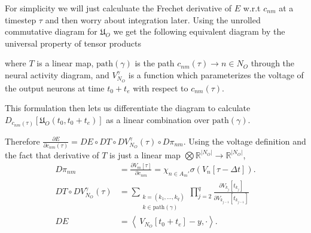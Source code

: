 For simplicity we will just calculuate the Frechet derivative of $E$ w.r.t $c_{nm}$ at a timestep $\tau$ and then worry about integration later. Using the unrolled commutative diagram for $\mathfrak{U}_O$ we get the following equivalent diagram by the universal property of tensor products
\begin{center}
	\end{center} 
	where $T$ is a linear map, $\text{path}(\gamma)$ is the path $c_{nm}(\tau) \to n \in N_O$ through the neural activity diagram, and $V_{N_O}^\gamma$ is a function which parameterizes the voltage of the output neurons at time $t_0 + t_e$ with respect to $c_{nm}(\tau)$. 

	This formulation then lets us differentiate the diagram to calculate $D_{c_{nm}(\tau)}\left[\mathfrak{U}_O(t_0,t_0+t_e)\right]$ as a linear combination over $\text{path}(\gamma).$

	\begin{center}
	\end{center}

	Therefore $\frac{\partial E}{\partial c_{nm}(\tau)} = DE \circ DT \circ DV_{N_O}^\gamma(\tau) \circ D\pi_{nm}$. Using the voltage definition and the fact that derivative of $T$ is just a linear map $\bigotimes \mathbb{R}^{|N_O|} \to \mathbb{R}^{|N_O|}$,
	\begin{equation}
		\begin{aligned}
			D\pi_{nm} &= \frac{\partial V_m[\tau]}{\partial c_{nm}} = \chi_{n \in A_m'} \sigma(V_n[\tau-\Delta t]). \\
			DT\circ DV^{\gamma}_{N_O}(\tau)
				&= \sum_{
					\substack{
						k = (k_1, \dots, k_q)\\
						k \in \text{path}(\gamma)
					}} 
				\prod_{j=2}^{q}
				 	\frac{\partial V_{k_j}[t_{k_j}]}{\partial V_{k_{j-1}}[t_{k_{j-1}}]} \\
				 	DE &= \left\langle\ V_{N_O}[t_0 + t_e] - y, \cdot \right\rangle. 
		\end{aligned}
	\end{equation}

